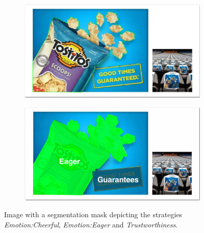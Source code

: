 \documentclass[hidelinks,11pt,a4paper]{report}
\begin{document}
\begin{figure}[!h]
     \begin{subfigure}[b]{0.4\textwidth}
         \includegraphics[scale=0.22]{images/Image4.png}
     \end{subfigure}
     \begin{subfigure}[b]{0.4\textwidth}
         \includegraphics[scale=0.22]{images/Image4_Segment.png}
     \end{subfigure}
     
    \caption{\small \label{fig:segmented image} Image with a segmentation mask depicting the strategies \textit{Emotion:Cheerful}, \textit{Emotion:Eager} and \textit{Trustworthiness}.}
\end{figure}
\end{document}
